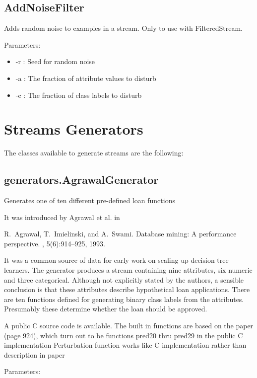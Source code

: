 \documentclass[a4paper,12pt,twoside]{book}
\begin{document}
\subsection{AddNoiseFilter} Adds random noise to examples in a stream. Only to use with FilteredStream.

Parameters:

\begin{itemize}
\item -r : Seed for random noise 
\item -a : The fraction of attribute values to disturb
\item -c : The fraction of class labels to disturb\end{itemize}

\section{Streams Generators}
	
The classes available to generate streams are the following:

\subsection{generators.AgrawalGenerator} Generates one of ten different pre-defined loan functions

It was introduced by Agrawal et al. in
\begin{itemize}
R.~Agrawal, T.~Imielinski, and A.~Swami.
\newblock Database mining: A performance perspective.
, 5(6):914--925, 1993.\end{itemize}

It was a common
source of data for early work on scaling up decision tree learners.
The generator produces a stream containing nine attributes, six numeric and 
three categorical. Although not explicitly stated by the authors, a sensible 
conclusion is that these attributes describe hypothetical loan applications.
There are ten functions defined for generating binary class labels from the
attributes. 
Presumably these determine whether the loan should be approved. 

A public C source code is available.
 The built in functions are based on the paper (page 924),
  which turn out to be functions pred20 thru pred29 in the public C implementation
 Perturbation function works like C implementation rather than description in paper	

Parameters:
\end{document}
